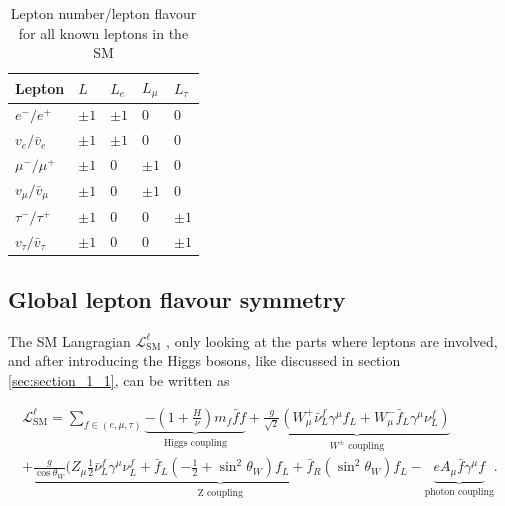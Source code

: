 \begin{table}[h]
	\centering
	\caption[Lepton number/lepton flavour of leptons]{Lepton number/lepton flavour for all known leptons in the \gls{SM}}
	\label{tab:tab_1_2}

	\begin{tabular}{l|l|l|l|l}
		Lepton				&$L$		&$L_{e}$	&$L_{\mu}$	&$L_{\tau}$	\\ \hline
		
		$e^{-}/e^{+}$			&$\pm 1$	&$\pm 1$	&0		&0		\\

		$v_{e}/\bar{v}_{e}$		&$\pm 1$	&$\pm 1$	&0		&0		\\
		
		$\mu^{-}/\mu^{+}$		&$\pm 1$	&0		&$\pm 1$	&0		\\

		$v_{\mu}/\bar{v}_{\mu}$		&$\pm 1$	&0		&$\pm 1$	&0		\\
		
		$\tau^{-}/\tau^{+}$		&$\pm 1$	&0		&0		&$\pm 1$	\\

		$v_{\tau}/\bar{v}_{\tau}$	&$\pm 1$	&0		&0		&$\pm 1$	\\			
	\end{tabular}
\end{table}


\subsection{Global lepton flavour symmetry}
\label{sec:section_1_3_1}

The \gls{SM} Langragian $\mathcal{L}^{\ell}_{\text{SM}}$ \cite{Peskin, EWK}, only looking at the parts where leptons are involved, and after introducing the Higgs bosons, like discussed in section \ref{sec:section_1_1}, can be written as

\begin{multline}
	\label{eq:eq_1_12}
	\mathcal{L}^{\ell}_{\text{SM}} = \sum_{f \in (e, \mu, \tau)} \underbrace{-(1+\frac{H}{\nu}) m_{f} \bar{f}f}_\text{Higgs coupling} + \underbrace{\frac{g}{\sqrt{2}} (W^{+}_{\mu} \bar{\nu}^{f}_{L} \gamma^{\mu} f_{L} + W^{-}_{\mu} \bar{f}_{L} \gamma^{\mu} \nu^{f}_{L})}_{W^{\pm} \text{ coupling}} \\
	+ \underbrace{\frac{g}{\cos{\theta_{W}}}(Z_{\mu} \frac{1}{2} \bar{\nu}^{f}_{L} \gamma^{\mu}\nu^{f}_{L} + \bar{f}_{L}(-\frac{1}{2} + \sin^2{\theta_{W}})f_{L} + \bar{f}_{R}(\sin^2{\theta_{W}})f_{L}}_{\text{Z coupling}} - \underbrace{eA_{\mu}\bar{f}\gamma^{\mu}f}_{\text{photon coupling}}.
\end{multline}

